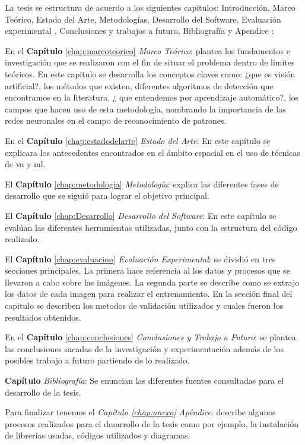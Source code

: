 La tesis se estructura de acuerdo a los siguientes capítulos: Introducción, Marco Teórico, Estado del Arte, Metodologías, Desarrollo del Software, Evaluación experimental , Conclusiones y trabajos a futuro, Bibliografía y Apendice :

En el \textbf{Capítulo} \ref{chap:marcoteorico} \textit{Marco Teórico}: plantea los fundamentos e investigación que se realizaron con el fin de situar el problema dentro de limites teóricos. En este capitulo se desarrolla los conceptos claves como: ¿que es visión artificial?, los métodos que existen, diferentes algoritmos de detección que encontramos en la literatura, ¿ que entendemos por aprendizaje automático?, los campos que hacen uso de esta metodología, nombrando la importancia de las redes neuronales en el campo de reconocimiento de patrones.

En el \textbf{Capítulo} \ref{chap:estadodelarte} \textit{Estado del Arte}: En este capítulo se explicara los antecedentes encontrados en el ámbito espacial en el uso de técnicas de \ac{va} y \ac{ml}.

El \textbf{Capítulo} \ref{chap:metodologia} \textit{Metodología}: explica las diferentes fases de desarrollo que se siguió para lograr el objetivo principal.

El \textbf{Capítulo} \ref{chap:Desarrollo} \textit{Desarrollo del Software}: En este capítulo se evalúan las diferentes herramientas utilizadas, junto con la estructura del código realizado.

El \textbf{Capítulo} \ref{chap:evaluacion} \textit{Evaluación Experimental}:  se  dividió en tres secciones principales. La primera hace referencia al los datos y procesos que se llevaron a cabo sobre las imágenes. La segunda parte se describe como se extrajo los datos de cada imagen para realizar el entrenamiento. En la sección final del capitulo se describen los metodos de validación utilizados y cuales fueron los resultados obtenidos.

En el \textbf{Capítulo} \ref{chap:conclusiones} \textit{Conclusiones y Trabajo a Futuro}: se plantea las conclusiones sacadas de la investigación y experimentación además de los posibles trabajo a futuro partiendo de lo realizado.

\textbf{Capítulo} \textit{Bibliografía}: Se enuncian las diferentes fuentes consultadas para el desarrollo de la tesis.

Para finalizar tenemos el \textit{Capítulo \ref{chap:anexo} Apéndice}: describe algunos procesos realizados para el desarrollo de la tesis como por ejemplo, la instalación de librerías usadas, códigos utilizados y diagramas.

